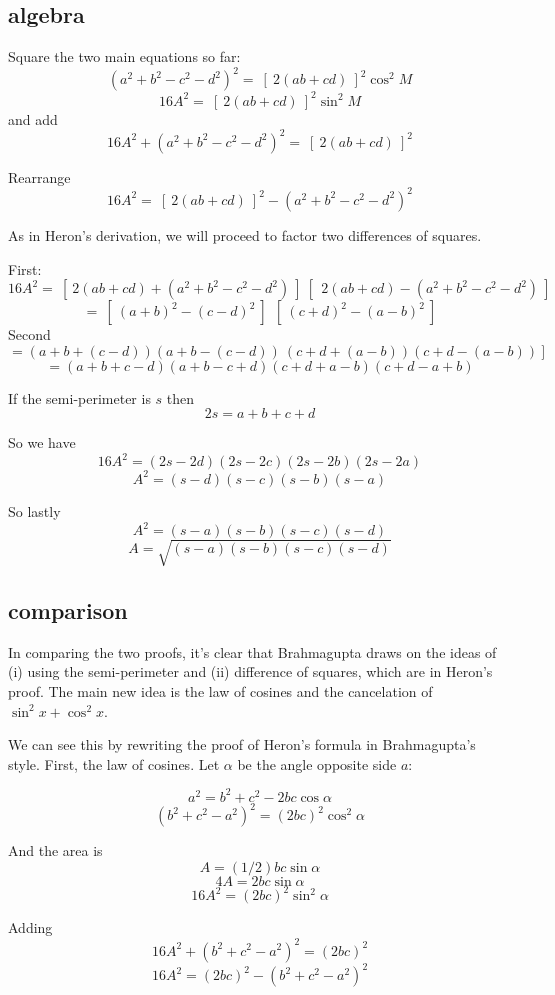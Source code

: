 \documentclass[11pt, oneside]{article}
\begin{document}
\subsection*{algebra}

Square the two main equations so far:
\[ (a^2 + b^2 - c^2 - d^2)^2 =  \ [ \ 2(ab + cd) \ ]^2 \cos^2 M \]
\[ 16A^2 =  \ [ \ 2(ab + cd) \ ]^2 \sin^2 M \]
and add
\[ 16A^2 + (a^2 + b^2 - c^2 - d^2)^2 =   \ [ \ 2(ab + cd) \ ]^2 \]

Rearrange
\[ 16A^2 =   \ [ \ 2(ab + cd) \ ]^2 - (a^2 + b^2 - c^2 - d^2)^2 \]

As in Heron's derivation, we will proceed to factor two differences of squares.  

First:
\[ 16A^2 =   \ [ \ 2(ab + cd) + (a^2 + b^2 - c^2 - d^2) \ ] \ [ \ \ 2(ab + cd) - (a^2 + b^2 - c^2 - d^2) \ ] \]
\[ = \ [ \ (a + b)^2 - (c - d)^2 \ ] \  \ [ \ (c + d)^2 - (a - b)^2 \ ] \]
Second
\[ = (a + b + (c - d))(a + b - (c - d)) \ (c + d + (a - b))(c + d - (a - b)) \ ] \]
\[ = (a + b + c - d)(a + b - c + d)(c + d + a - b)(c + d - a + b) \]

If the semi-perimeter is $s$ then
\[ 2s = a + b + c + d \]

So we have
\[ 16A^2 = (2s - 2d)(2s - 2c)(2s - 2b)(2s - 2a) \]
\[ A^2 = (s - d)(s - c)(s - b)(s - a) \]

So lastly
\[ A^2 = (s - a)(s - b)(s - c)(s - d) \]
\[ A = \sqrt{(s - a)(s - b)(s - c)(s - d)} \]

\subsection*{comparison}

In comparing the two proofs, it's clear that Brahmagupta draws on the ideas of (i) using the semi-perimeter and (ii) difference of squares, which are in Heron's proof.  The main new idea is the law of cosines and the cancelation of $\sin^2 x + \cos^2 x$.

We can see this by rewriting the proof of Heron's formula in Brahmagupta's style.  First, the law of cosines.  Let $\alpha$ be the angle opposite side $a$:

\[ a^2 = b^2 + c^2 - 2bc \cos \alpha \]
\[ (b^2 + c^2 - a^2)^2 = (2bc)^2 \cos^2 \alpha \]

And the area is
\[ A = (1/2) bc \sin \alpha \]
\[ 4A = 2bc \sin \alpha \]
\[ 16A^2 = (2bc)^2 \sin^2 \alpha \]

Adding
\[ 16A^2 + (b^2 + c^2 - a^2)^2 = (2bc)^2  \]
\[ 16A^2 = (2bc)^2 - (b^2 + c^2 - a^2)^2  \]
\end{document}
